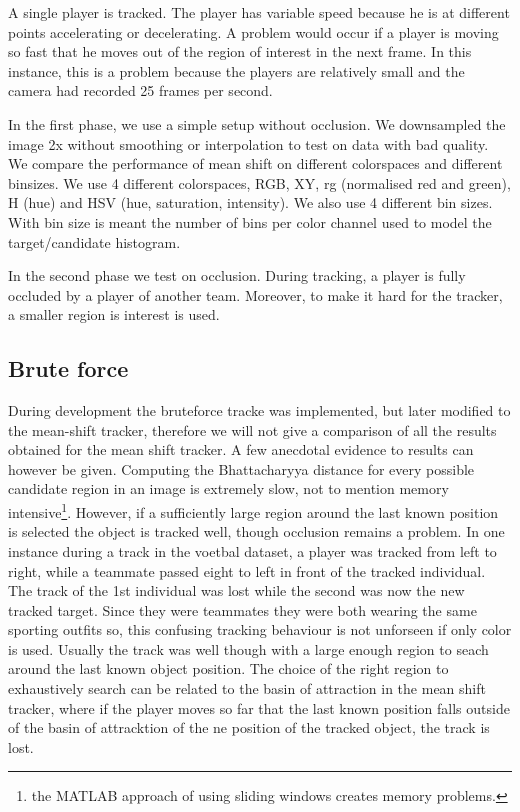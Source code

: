 \documentclass[a4paper,11pt]{article}
\begin{document}
	A single player is tracked. The player has variable speed because he is at
	different points accelerating or decelerating. A problem would occur if a
	player is moving so fast that he moves out of the region of interest in the
	next frame. In this instance, this is a problem because the players are
	relatively small and the camera had recorded 25 frames per second.
	
	In the first phase, we use a simple setup without occlusion. We downsampled
	the image 2x without smoothing or interpolation to test on data with bad
	quality.  We compare the performance of mean shift on different colorspaces
	and different binsizes.  We use 4 different colorspaces, RGB, XY, rg
	(normalised red and green), H (hue) and HSV (hue, saturation, intensity). We
	also use 4 different bin sizes. With bin size is meant the number of bins
	per color channel used to model the target/candidate histogram.

	In the second phase we test on occlusion. During tracking, a player is fully
	occluded by a player of another team. Moreover, to make it hard for the
	tracker, a smaller region is interest is used. 




	\subsection{Brute force} 
	During development the bruteforce tracke was implemented, but later modified to the mean-shift tracker, therefore we will not give a comparison of all the results obtained for the mean shift tracker. A few anecdotal evidence to results can however be given. Computing the Bhattacharyya distance for every possible candidate region in an image is extremely slow, not to mention memory intensive\footnote{the MATLAB approach of using sliding windows creates memory problems.}. However, if a sufficiently large region around the last known position is selected the object is tracked well, though occlusion remains a problem. In one instance during a track in the voetbal dataset, a player was tracked from left to right, while a teammate passed eight to left in front of the tracked individual. The track of the 1st individual was lost while the second was now the new tracked target. Since they were teammates they were both wearing the same sporting outfits so, this confusing tracking behaviour is not unforseen if only color is used. Usually the track was well though with a large enough region to seach around the last known object position. The choice of the right region to exhaustively search can be related to the basin of attraction in the mean shift tracker, where if the player moves so far that the last known position falls outside of the basin of attracktion of the ne position of the tracked object, the track is lost.
\end{document}
